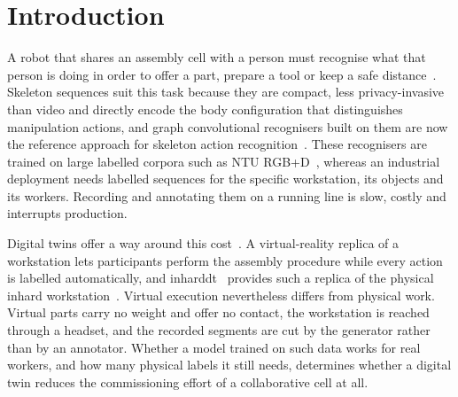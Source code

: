 \documentclass[Royal,sagev,times]{sagej}
\begin{document}
\maketitle

\section{Introduction}
\label{sec:introduction}

A robot that shares an assembly cell with a person must recognise what that
person is doing in order to offer a part, prepare a tool or keep a safe
distance~\cite{wang2018hrcmotion}. Skeleton sequences suit this task because
they are compact, less privacy-invasive than video and directly encode the body
configuration that distinguishes manipulation actions, and graph convolutional
recognisers built on them are now the reference approach for skeleton action
recognition~\cite{yan2018stgcn,chen2021ctrgcn,liu2025skeletonreview}. These
recognisers are trained on large labelled corpora such as NTU
RGB+D~\cite{shahroudy2016ntu,liu2020ntu120}, whereas an industrial deployment
needs labelled sequences for the specific workstation, its objects and its
workers. Recording and annotating them on a running line is slow, costly and
interrupts production.

Digital twins offer a way around this cost~\cite{tao2019digitaltwin}. A
virtual-reality replica of a workstation lets participants perform the assembly
procedure while every action is labelled automatically, and
\ac{inharddt}~\cite{dallel2023digital} provides such a replica of the physical
\ac{inhard} workstation~\cite{dallel2020inhardpaper}. Virtual execution
nevertheless differs from physical work. Virtual parts carry no weight and
offer no contact, the workstation is reached through a headset, and the
recorded segments are cut by the generator rather than by an annotator. Whether
a model trained on such data works for real workers, and how many physical
labels it still needs, determines whether a digital twin reduces the
commissioning effort of a collaborative cell at all.
\end{document}
